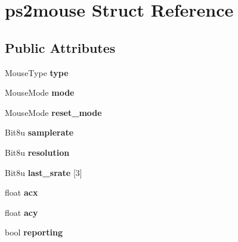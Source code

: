 \hypertarget{structps2mouse}{\section{ps2mouse Struct Reference}
\label{structps2mouse}
}
\subsection*{Public Attributes}
\begin{DoxyCompactItemize}
\item 
\hypertarget{structps2mouse_a7fe3750b0edc8c419f63b4d69d2e4a61}{Mouse\-Type {\bfseries type}}\label{structps2mouse_a7fe3750b0edc8c419f63b4d69d2e4a61}

\item 
\hypertarget{structps2mouse_adc3cc77c0d71cd3de66efaa0cf69c1ef}{Mouse\-Mode {\bfseries mode}}\label{structps2mouse_adc3cc77c0d71cd3de66efaa0cf69c1ef}

\item 
\hypertarget{structps2mouse_ab070e212ddc67bcafb6acc76266b4911}{Mouse\-Mode {\bfseries reset\-\_\-mode}}\label{structps2mouse_ab070e212ddc67bcafb6acc76266b4911}

\item 
\hypertarget{structps2mouse_ad52629cc22e4fd3ea10b8b0aff9a8846}{Bit8u {\bfseries samplerate}}\label{structps2mouse_ad52629cc22e4fd3ea10b8b0aff9a8846}

\item 
\hypertarget{structps2mouse_aa2a475d5fb109bd61e58188d5e26e7d5}{Bit8u {\bfseries resolution}}\label{structps2mouse_aa2a475d5fb109bd61e58188d5e26e7d5}

\item 
\hypertarget{structps2mouse_a3bc7004906bf9b4dbb23f81f4a639a34}{Bit8u {\bfseries last\-\_\-srate} \mbox{[}3\mbox{]}}\label{structps2mouse_a3bc7004906bf9b4dbb23f81f4a639a34}

\item 
\hypertarget{structps2mouse_ae5facc7007c3afdf5d5e157ffbbe2c5d}{float {\bfseries acx}}\label{structps2mouse_ae5facc7007c3afdf5d5e157ffbbe2c5d}

\item 
\hypertarget{structps2mouse_ac3941a40e4b709c586ba9fb5d868b8a3}{float {\bfseries acy}}\label{structps2mouse_ac3941a40e4b709c586ba9fb5d868b8a3}

\item 
\hypertarget{structps2mouse_a76a01124e6b24e5437e82db564863ac3}{bool {\bfseries reporting}}\label{structps2mouse_a76a01124e6b24e5437e82db564863ac3}


\end{DoxyCompactItemize}
